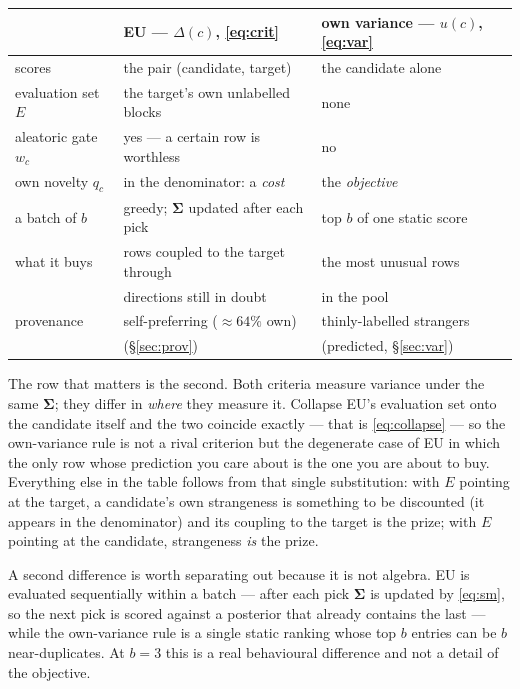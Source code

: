 \documentclass[11pt]{article}
\newcommand{\bS}{\bm{\Sigma}}
\begin{document}
\begin{center}
\begin{tabular}{@{}lll@{}}
\toprule
 & \textbf{EU} --- $\Delta(c)$, \eqref{eq:crit} & \textbf{own variance} --- $u(c)$, \eqref{eq:var} \\
\midrule
scores                & the pair (candidate, target)      & the candidate alone \\
evaluation set $E$    & the target's own unlabelled blocks & none \\
aleatoric gate $w_c$  & yes --- a certain row is worthless & no \\
own novelty $q_c$     & in the denominator: a \emph{cost}  & the \emph{objective} \\
a batch of $b$        & greedy; $\bS$ updated after each pick & top $b$ of one static score \\
what it buys          & rows coupled to the target through  & the most unusual rows \\
                      & directions still in doubt           & in the pool \\
provenance            & self-preferring ($\approx\!64\%$ own) & thinly-labelled strangers \\
                      & (\S\ref{sec:prov})                  & (predicted, \S\ref{sec:var}) \\
\bottomrule
\end{tabular}
\end{center}

The row that matters is the second. Both criteria measure variance under the same $\bS$; they
differ in \emph{where} they measure it. Collapse EU's evaluation set onto the candidate itself
and the two coincide exactly --- that is \eqref{eq:collapse} --- so the own-variance rule is not a
rival criterion but the degenerate case of EU in which the only row whose prediction you care
about is the one you are about to buy. Everything else in the table follows from that single
substitution: with $E$ pointing at the target, a candidate's own strangeness is something to be
discounted (it appears in the denominator) and its coupling to the target is the prize; with $E$
pointing at the candidate, strangeness \emph{is} the prize.

A second difference is worth separating out because it is not algebra. EU is evaluated
sequentially within a batch --- after each pick $\bS$ is updated by \eqref{eq:sm}, so the next
pick is scored against a posterior that already contains the last --- while the own-variance rule
is a single static ranking whose top $b$ entries can be $b$ near-duplicates. At $b=3$ this is a
real behavioural difference and not a detail of the objective.
\end{document}
